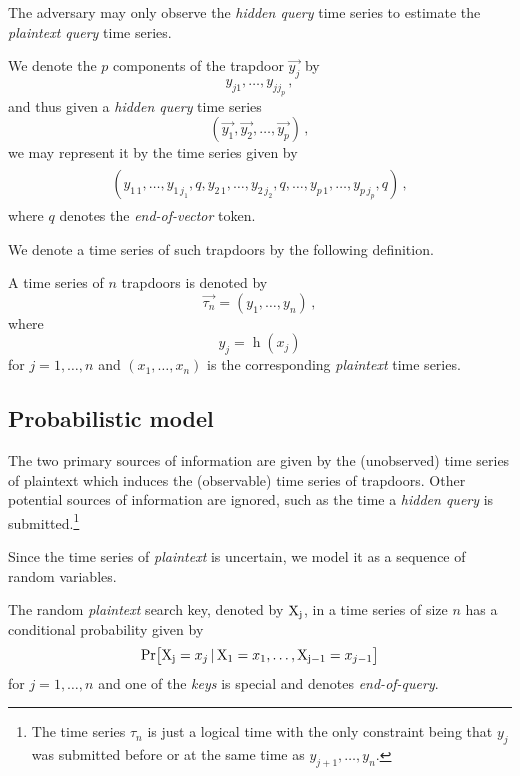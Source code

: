 \documentclass[ ../main.tex]{subfiles}
\begin{document}
\begin{assumption}
The adversary may only observe the \emph{hidden query} time series to estimate the \emph{plaintext query} time series.
\end{assumption}

We denote the $p$ components of the \jth trapdoor $\vec{y_j}$ by
\[
    y_{j 1},\ldots,y_{j j_p}\,,
\]
and thus given a \emph{hidden query} time series
\begin{equation}
    \left(\vec{y_1}, \vec{y_2}, \ldots, \vec{y_p}\right)\,,
\end{equation}
we may represent it by the time series given by
\begin{align}
\begin{split}
    \left(y_{1\,1}, \ldots, y_{1\,j_1}, q, y_{2\,1}, \ldots, y_{2\,j_2}, q, \ldots, y_{p\,1},\ldots, y_{p\,j_p}, q\right)\,,
\end{split}
\end{align}
where $q$ denotes the \emph{end-of-vector} token.

We denote a time series of such trapdoors by the following definition.
\begin{definition}
A time series of $n$ trapdoors is denoted by
\begin{equation}
    \vec{\tau_n} = \left(y_1, \ldots, y_n\right)\,,
\end{equation}
where
\begin{equation}
    y_j = \operatorname{h}(x_j)
\end{equation}
for $j=1,\ldots,n$ and $(x_1,\ldots,x_n)$ is the corresponding \emph{plaintext} time series.
\end{definition}

\subsection{Probabilistic model}
\label{sec:pr_model}
The two primary sources of information are given by the (unobserved) time series of plaintext which induces the (observable) time series of trapdoors. Other potential sources of information are ignored, such as the time a \emph{hidden query} is submitted.\footnote{The time series $\tau_n$ is just a logical time with the only constraint being that $y_j$ was submitted before or at the same time as $y_{j+1},\ldots,y_n$.} 

Since the time series of \emph{plaintext} is uncertain, we model it as a sequence of random variables.
\begin{definition}
The \jth random \emph{plaintext} search key, denoted by $\mathrm{X_j}$, in a time series of size $n$ has a conditional probability given by
\begin{equation}
    \Pr\!\left[\mathrm{X_j} = x_j {\,|\,} \mathrm{X_1} = x_1,\ldots,\mathrm{X_{j-1}} = x_{j-1}\right]
\end{equation}
for $j=1,\ldots,n$ and one of the \emph{keys} is special and denotes \emph{end-of-query}.
\end{definition}
\end{document}
